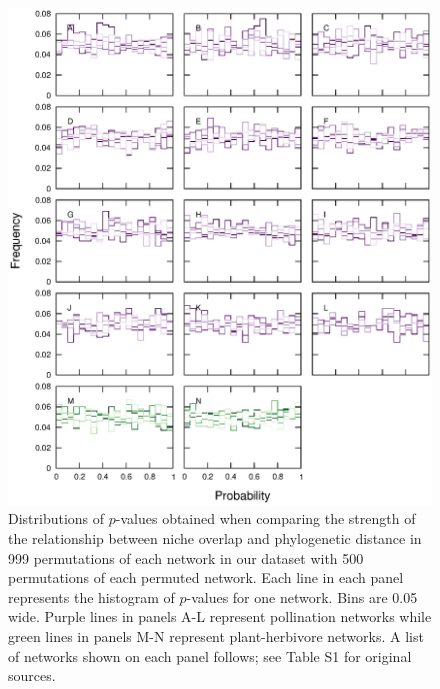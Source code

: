 \documentclass[12pt]{article}
\begin{document}
\begin{spacing}{1.0}
\begin{figure}[!h]
    \begin{center}
      \centerline{\includegraphics*[width=.75\textwidth]{Figures/random_p_distributions.eps}}
    \end{center}
     \caption{\small Distributions of $p$-values obtained when comparing the strength of the relationship between niche overlap and phylogenetic distance in 999 permutations of each network in our dataset with 500 permutations of each permuted network. Each line in each panel represents the histogram of $p$-values for one network. Bins are 0.05 wide. Purple lines in panels A-L represent pollination networks while green lines in panels M-N represent plant-herbivore networks. A list of networks shown on each panel follows; see Table S1 for original sources.
     }
    \label{within_family_regression}
  \end{figure}



\end{spacing}
\end{document}
